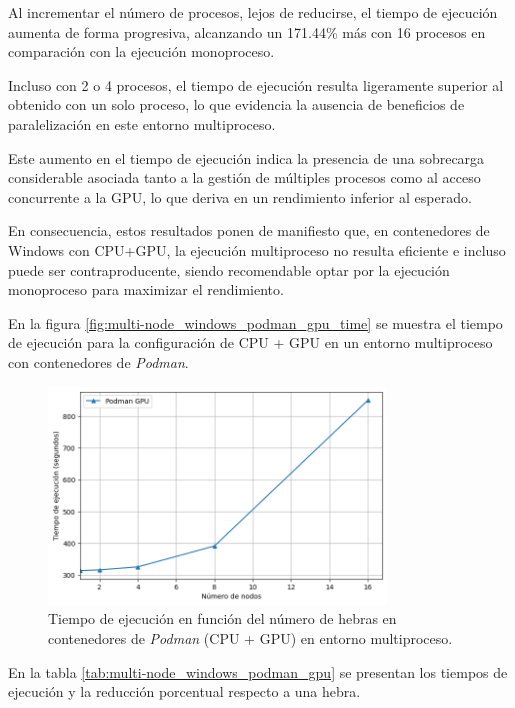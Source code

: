 Al incrementar el número de procesos, lejos de reducirse, el tiempo de ejecución aumenta de forma progresiva, alcanzando un 171.44\% más con 16 procesos en comparación con la ejecución monoproceso.

Incluso con 2 o 4 procesos, el tiempo de ejecución resulta ligeramente superior al obtenido con un solo proceso, lo que evidencia la ausencia de beneficios de paralelización en este entorno multiproceso.

Este aumento en el tiempo de ejecución indica la presencia de una sobrecarga considerable asociada tanto a la gestión de múltiples procesos como al acceso concurrente a la GPU, lo que deriva en un rendimiento inferior al esperado.

En consecuencia, estos resultados ponen de manifiesto que, en contenedores de Windows con CPU+GPU, la ejecución multiproceso no resulta eficiente e incluso puede ser contraproducente, siendo recomendable optar por la ejecución monoproceso para maximizar el rendimiento.

En la figura \ref{fig:multi-node_windows_podman_gpu_time} se muestra el tiempo de ejecución para la configuración de CPU + GPU en un entorno multiproceso con contenedores de \textit{Podman}.

\begin{figure}[ht]
    \centering
    \includegraphics[width=0.8\textwidth]{imagenes/cap5/multi-node_ubuntu_podman_gpu_time.png}
    \caption{Tiempo de ejecución en función del número de hebras en contenedores de \textit{Podman} (CPU + GPU) en entorno multiproceso.}
    \label{fig:multi-node_ubuntu_podman_gpu_time}
\end{figure}

En la tabla \ref{tab:multi-node_windows_podman_gpu} se presentan los tiempos de ejecución y la reducción porcentual respecto a una hebra.

